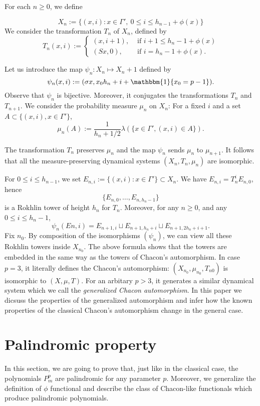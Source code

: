 \documentclass[a4paper]{article}
\theoremstyle{plain}
\theoremstyle{definition}
\begin{document}
For each $n \ge 0$, we define

$$X_n:=\{(x,i): x \in \Gamma',\ 0 \le i \le h_{n-1} + \phi(x)\}$$
We consider the transformation $T_n$ of $X_n$, defined by
$$T_n(x, i) := \begin{cases}
(x,i+1), & \text{ if } i+1 \le h_n - 1 + \phi(x) \\
(Sx,0), & \text{ if } i=h_n-1+\phi(x). \end{cases}$$

Let us introduce the map $\psi_n : X_n \mapsto X_n+1$ defined by
$$\psi_n(x,i):=(\sigma x, x_0 h_n + i + \mathbbm{1}\{x_0=p-1\}).$$
Observe that $\psi_n$ is bijective. Moreover, it conjugates the transformations $T_n$ and
$T_{n+1}$. We consider the probability measure $\mu_n$ on $X_n$: For a fixed $i$ and a set
$A \subset \{(x, i), x\in\Gamma' \}$,
$$\mu_n(A):=\frac{1}{h_n + 1/2} \lambda (\{x \in \Gamma', (x, i) \in A\}).$$

The transformation $T_n$ preserves $\mu_n$ and the map $\psi_n$ sends $\mu_n$ to $\mu_{n+1}$. It follows that all the measure-preserving dynamical systems $(X_n, T_n, \mu_n)$ are isomorphic.

For $ 0 \le i \le h_{n-1}$, we set
$E_{n,i} := \{(x, i) : x \in \Gamma'\} \subset X_n$. We have $E_{n,i} = T^i_n E_{n,0}$, hence
 $$\{E_{n,0},\ldots,E_{n,h_n-1}\}$$
is a Rokhlin tower of height $h_n$ for $T_n$. Moreover, for any $n \ge 0$, and any $0 \le i \le
h_n-1$,
$$\psi_n(En,i) = E_{n+1,i} \sqcup E_{n+1,h_n+i} \sqcup E_{n+1,2h_n+i+1}.$$
Fix $n_0$. By composition of the isomorphisms $(\psi_n)$, we can view all these Rokhlin
towers inside $X_{n_0}$. The above formula shows that the towers are embedded in the
same way as the towers of Chacon’s automorphism. In case $p=3$, it literally defines the Chacon's automorphism: $(X_{n_0} , \mu_{n_0} , T_{n0})$ is isomorphic to $(X,\mu,T)$. For an arbitary $p > 3$, it generates a similar dynamical system which we call the \emph{generalized Chacon automorphism}. In this paper we dicsuss the properties of the generalized automorphism and infer how the known properties of the classical Chacon's automorphism change in the general case.

\section{Palindromic property}
In this section, we are going to prove that, just like in the classical case, the polynomials $P_m^p$ are palindromic for any parameter $p$. Moreover, we generalize the definition of $\phi$ functional and describe the class of Chacon-like functionals which produce palindromic polynomials.
\end{document}
